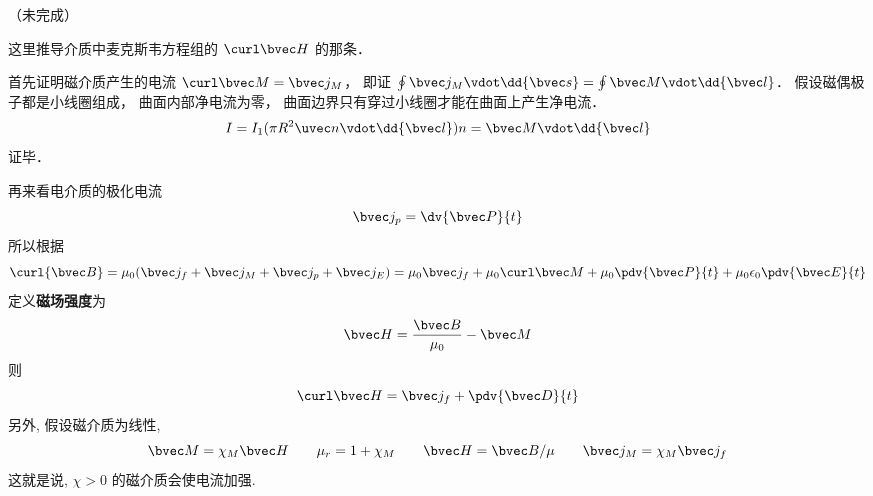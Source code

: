 
（未完成）

这里推导介质中麦克斯韦方程组的 $\curl \bvec H$ 的那条．

首先证明磁介质产生的电流 $\curl \bvec M = \bvec j_M$， 即证 $\oint \bvec j_M \vdot \dd{\bvec s} = \oint \bvec M \vdot \dd{\bvec l}$． 假设磁偶极子都是小线圈组成， 曲面内部净电流为零， 曲面边界只有穿过小线圈才能在曲面上产生净电流．
\begin{equation}
I = I_1 (\pi R^2 \uvec n \vdot \dd{\bvec l}) n = \bvec M \vdot \dd{\bvec l}
\end{equation}
证毕．

再来看电介质的极化电流
\begin{equation}
\bvec j_p = \dv{\bvec P}{t}
\end{equation}
所以根据
\begin{equation}
\curl {\bvec B} = \mu_0 (\bvec j_f + \bvec j_M + \bvec j_p + \bvec j_E) = \mu_0 \bvec j_f + \mu_0 \curl \bvec M + \mu_0 \pdv{\bvec P}{t} + \mu_0 \epsilon_0 \pdv{\bvec E}{t}
\end{equation}
定义\textbf{磁场强度}为
\begin{equation}
\bvec H = \frac{\bvec B}{\mu_0} - \bvec M
\end{equation}
则
\begin{equation}
\curl \bvec H = \bvec j_f + \pdv{\bvec D}{t}
\end{equation}
另外, 假设磁介质为线性,
\begin{equation}
\bvec M = \chi_M \bvec H
\qquad
\mu_r = 1 + \chi_M
\qquad
\bvec H = \bvec B/\mu
\qquad
\bvec j_M = \chi_M \bvec j_f
\end{equation}
这就是说,  $\chi > 0$ 的磁介质会使电流加强.
